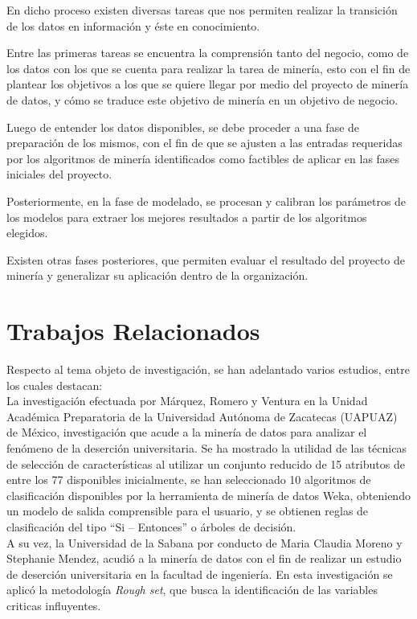 \documentclass[fleqn,10pt]{SelfArx} %
\begin{document}
En dicho proceso existen diversas tareas que nos permiten realizar la transición de los datos en información y éste en conocimiento.

Entre las primeras tareas se encuentra la comprensión tanto del negocio, como de los datos con los que se cuenta para realizar la tarea de minería, esto con el fin de plantear los objetivos a los que se quiere llegar por medio del proyecto de minería de datos, y cómo se traduce este objetivo de minería en un objetivo de negocio.

Luego de entender los datos disponibles, se debe proceder a una fase de preparación de los mismos, con el fin de que se ajusten a las entradas requeridas por los algoritmos de minería identificados como factibles de aplicar en las fases iniciales del proyecto.

Posteriormente, en la fase de modelado, se procesan y calibran los parámetros de los modelos para extraer los mejores resultados a partir de los algoritmos elegidos.

Existen otras fases posteriores, que permiten evaluar el resultado del proyecto de minería y generalizar su aplicación dentro de la organización.


\section{Trabajos Relacionados}
Respecto al tema objeto de investigación, se han adelantado varios estudios, entre los cuales destacan:\\

La investigación efectuada por Márquez, Romero y Ventura en la Unidad Académica Preparatoria de la Universidad Autónoma de Zacatecas (UAPUAZ) de México, investigación que acude a la minería de datos para analizar el fenómeno de la deserción universitaria. Se ha mostrado la utilidad de las técnicas de selección de características al utilizar un conjunto reducido de 15 atributos de entre los 77 disponibles inicialmente, se han seleccionado 10 algoritmos de clasificación disponibles por la herramienta de minería de datos Weka, obteniendo un modelo de salida comprensible para el usuario, y se obtienen reglas de clasificación del tipo “Si – Entonces” o árboles de decisión.\\

A su vez, la Universidad de la Sabana por conducto de Maria Claudia Moreno y Stephanie Mendez, acudió a la minería de datos con el fin de realizar un estudio de deserción universitaria en la facultad de ingeniería. En esta investigación se aplicó la metodología \textit{Rough set}, que busca la identificación de las variables criticas influyentes.\\
\end{document}
